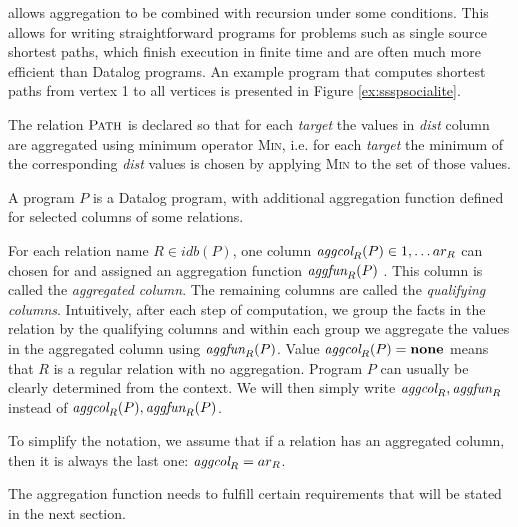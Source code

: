 \datalogra allows aggregation to be combined with recursion under some conditions. This allows for writing straightforward programs for problems such as single source shortest paths, which finish execution in finite time and are often much more efficient than Datalog programs. An example \datalogra program that computes shortest paths from vertex 1 to all vertices is presented in Figure \ref{ex:ssspsocialite}.



The relation $\textsc{Path}$ is declared so that for each \textit{target} the values in \textit{dist} column are aggregated using minimum operator \textsc{Min}, i.e. for each \textit{target} the minimum of the corresponding \textit{dist} values is chosen by applying \textsc{Min} to the set of those values.

A \datalogra program $P$ is a Datalog program, with additional aggregation function defined for selected columns of some relations. 

For each relation name $R \in idb(P)$, one column $\textit{aggcol}_R(P) \in {1, \dots ar_R}$ can chosen for and assigned an aggregation function $\textit{aggfun}_R(P)$ . This column is called the \emph{aggregated column}. The remaining columns are called the \emph{qualifying columns}. Intuitively, after each step of computation, we group the facts in the relation by the qualifying columns and within each group we aggregate the values in the aggregated column using $\textit{aggfun}_R(P)$. Value $\textit{aggcol}_R(P) = \bf{none}$ means that $R$ is a regular relation with no aggregation. Program $P$ can usually be clearly determined from the context. We will then simply write $\textit{aggcol}_R, \textit{aggfun}_R$ instead of $\textit{aggcol}_R(P), \textit{aggfun}_R(P)$.

To simplify the notation, we assume that if a relation has an aggregated column, then it is always the last one: $\textit{aggcol}_R = ar_R$.

The aggregation function needs to fulfill certain requirements that will be stated in the next section.

